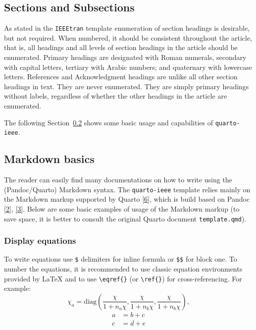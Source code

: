\documentclass[
  journal,
]{IEEEtran}%
\theoremstyle{plain}
\theoremstyle{remark}
\begin{document}
\hypertarget{sections-and-subsections}{%
\subsection{Sections and Subsections}\label{sections-and-subsections}}

As stated in the \texttt{IEEEtran} template enumeration of section
headings is desirable, but not required. When numbered, it should be
consistent throughout the article, that is, all headings and all levels
of section headings in the article should be enumerated. Primary
headings are designated with Roman numerals, secondary with capital
letters, tertiary with Arabic numbers; and quaternary with lowercase
letters. References and Acknowledgment headings are unlike all other
section headings in text. They are never enumerated. They are simply
primary headings without labels, regardless of whether the other
headings in the article are enumerated.

The following Section~\ref{sec-Markdown} shows some basic usage and
capabilities of \texttt{quarto-ieee}.

\hypertarget{sec-Markdown}{%
\subsection{Markdown basics}\label{sec-Markdown}}

The reader can easily find many documentations on how to write using the
(Pandoc/Quarto) Markdown syntax. The \texttt{quarto-ieee} template
relies mainly on the Markdown markup supported by Quarto
\protect\hyperlink{ref-quarto-markdown}{{[}6{]}}, which is build based
on Pandoc \protect\hyperlink{ref-MacFarlane_Pandoc}{{[}2{]}},
\protect\hyperlink{ref-Allaire_Quarto_2022}{{[}3{]}}. Below are some
basic examples of usage of the Markdown markup (to save space, it is
better to consult the original Quarto document \texttt{template.qmd}).

\hypertarget{display-equations}{%
\subsubsection{Display equations}\label{display-equations}}

To write equations use \texttt{\$} delimiters for inline formula or
\texttt{\$\$} for block one. To number the equations, it is recommended
to use classic equation environments provided by {\LaTeX} and to use
\texttt{\textbackslash{}eqref\{\}} (or \texttt{\textbackslash{}ref\{\}})
for cross-referencing. For example: \begin{equation}\label{eq:1}
{{\chi}_a}=\text{diag}\left(\frac{{\chi}}{1+n_a{\chi}},\frac{{\chi}}{1+n_b{\chi}},\frac{{\chi}}{1+n_b{\chi}}\right),
\end{equation} \begin{align}
a & = b + c \label{eq:2} \\
c & = d + e \label{eq:3}
\end{align}
\end{document}
